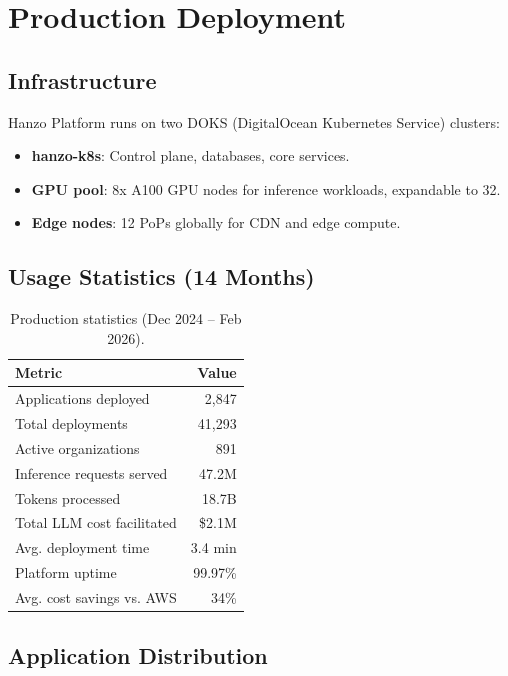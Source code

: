 \section{Production Deployment}

\label{sec:production}

\subsection{Infrastructure}

Hanzo Platform runs on two DOKS (DigitalOcean Kubernetes Service) clusters:

\begin{itemize}[leftmargin=1.1em]
    \item \textbf{hanzo-k8s}: Control plane, databases, core services.
    \item \textbf{GPU pool}: 8x A100 GPU nodes for inference workloads, expandable to 32.
    \item \textbf{Edge nodes}: 12 PoPs globally for CDN and edge compute.
\end{itemize}

\subsection{Usage Statistics (14 Months)}

\begin{table}[H]
\centering
\begin{tabular}{lr}
\toprule
\textbf{Metric} & \textbf{Value} \\
\midrule
Applications deployed & 2,847 \\
Total deployments & 41,293 \\
Active organizations & 891 \\
Inference requests served & 47.2M \\
Tokens processed & 18.7B \\
Total LLM cost facilitated & \$2.1M \\
Avg. deployment time & 3.4 min \\
Platform uptime & 99.97\% \\
Avg. cost savings vs. AWS & 34\% \\
\bottomrule
\end{tabular}
\caption{Production statistics (Dec 2024 -- Feb 2026).}
\label{tab:prod_stats}
\end{table}

\subsection{Application Distribution}

